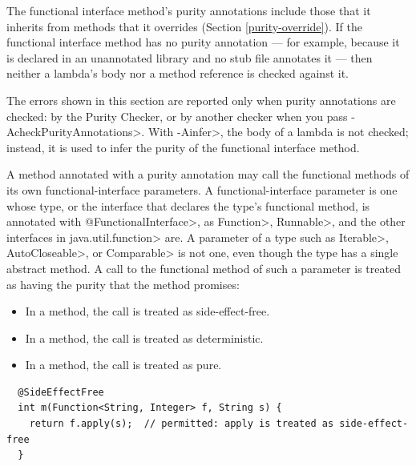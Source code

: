\noindent
The functional interface method's purity annotations include those that it
inherits from methods that it overrides
(Section \ref{purity-override}).  If the functional interface method has no
purity annotation --- for example, because it is declared in an unannotated
library and no stub file annotates it --- then neither a lambda's body nor
a method reference is checked against it.

The errors shown in this section are reported only when purity annotations
are checked:  by the Purity Checker, or by another checker when you pass
\<-AcheckPurityAnnotations>.  With \<-Ainfer>, the body of a lambda is not
checked; instead, it is used to infer the purity of the functional interface
method.



A method annotated with a purity annotation may call the functional methods
of its own functional-interface parameters.  A functional-interface parameter
is one whose type, or the interface that declares the type's functional method,
is annotated with \<@FunctionalInterface>, as \<Function>, \<Runnable>, and
the other interfaces in \<java.util.function> are.  A parameter of a type such
as \<Iterable>, \<AutoCloseable>, or \<Comparable> is not one, even though the
type has a single abstract method.  A call to the functional method of such a
parameter is treated as having the purity that the method promises:

\begin{itemize}
\item
  In a  method, the call is
  treated as side-effect-free.
\item
  In a  method, the call is
  treated as deterministic.
\item
  In a  method, the call is treated as
  pure.

\end{itemize}

\begin{Verbatim}
  @SideEffectFree
  int m(Function<String, Integer> f, String s) {
    return f.apply(s);  // permitted: apply is treated as side-effect-free
  }
\end{Verbatim}


